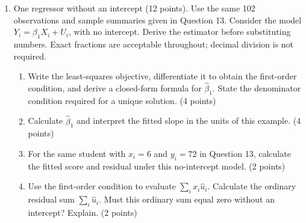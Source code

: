 \documentclass[a4paper,11pt,twoside]{article}
\begin{document}
\begin{enumerate}[label=\arabic*.,leftmargin=*,itemsep=5pt,topsep=4pt,parsep=0pt,start=9]
\Needspace{7cm}
\item One regressor without an intercept (12 points).
Use the same 102 observations and sample summaries given in Question 13.
Consider the model $Y_i=\beta_1X_i+U_i$, with no intercept. Derive the
estimator before substituting numbers. Exact fractions are acceptable
throughout; decimal division is not required.
\begin{enumerate}[label=(\alph*),leftmargin=*,itemsep=2pt,topsep=2pt]
\item Write the least-squares objective, differentiate it to obtain the
first-order condition, and derive a closed-form formula for
$\widehat\beta_1$. State the denominator condition required for a unique
solution. (4 points)
\item Calculate $\widehat\beta_1$ and
interpret the fitted slope in the units of this example. (4 points)
\item For the same student with $x_i=6$ and $y_i=72$ in Question 13,
calculate the fitted score and residual under this no-intercept model.
(2 points)
\item Use the first-order condition to evaluate
$\sum_i x_i\widehat u_i$. Calculate the ordinary residual sum
$\sum_i\widehat u_i$. Must this ordinary sum equal zero without an
intercept? Explain. (2 points)
\end{enumerate}


\end{enumerate}
\end{document}
